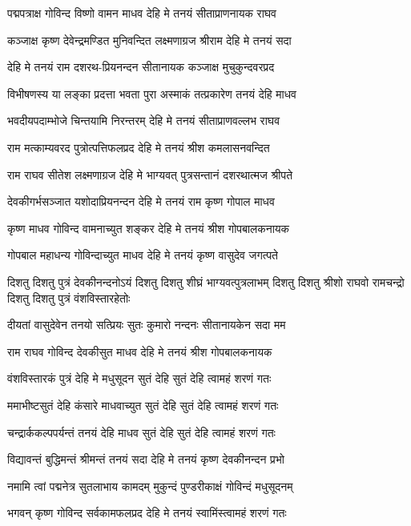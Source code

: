 \twolineshloka
{पद्मपत्राक्ष गोविन्द विष्णो वामन माधव}
{देहि मे तनयं सीताप्राणनायक राघव}%

\twolineshloka
{कञ्जाक्ष कृष्ण देवेन्द्रमण्डित मुनिवन्दित}
{लक्ष्मणाग्रज श्रीराम देहि मे तनयं सदा}%

\twolineshloka
{देहि मे तनयं राम दशरथ-प्रियनन्दन}
{सीतानायक कञ्जाक्ष मुचुकुन्दवरप्रद}%

\twolineshloka
{विभीषणस्य या लङ्का प्रदत्ता भवता पुरा}
{अस्माकं तत्प्रकारेण तनयं देहि माधव}%

\twolineshloka
{भवदीयपदाम्भोजे चिन्तयामि निरन्तरम्}
{देहि मे तनयं सीताप्राणवल्लभ राघव}%

\twolineshloka
{राम मत्काम्यवरद पुत्रोत्पत्तिफलप्रद}
{देहि मे तनयं श्रीश कमलासनवन्दित}%

\twolineshloka
{राम राघव सीतेश लक्ष्मणाग्रज देहि मे}
{भाग्यवत् पुत्रसन्तानं दशरथात्मज श्रीपते}%

\twolineshloka
{देवकीगर्भसञ्जात यशोदाप्रियनन्दन}
{देहि मे तनयं राम कृष्ण गोपाल माधव}%

\twolineshloka
{कृष्ण माधव गोविन्द वामनाच्युत शङ्कर}
{देहि मे तनयं श्रीश गोपबालकनायक}%

\twolineshloka
{गोपबाल महाधन्य गोविन्दाच्युत माधव}
{देहि मे तनयं कृष्ण वासुदेव जगत्पते}%

\fourlineindentedshloka
{दिशतु दिशतु पुत्रं देवकीनन्दनोऽयं}
{दिशतु दिशतु शीघ्रं भाग्यवत्पुत्रलाभम्}
{दिशतु दिशतु श्रीशो राघवो रामचन्द्रो}
{दिशतु दिशतु पुत्रं वंशविस्तारहेतोः}%

\twolineshloka
{दीयतां वासुदेवेन तनयो सत्प्रियः सुतः}
{कुमारो नन्दनः सीतानायकेन सदा मम}%

\twolineshloka
{राम राघव गोविन्द देवकीसुत माधव}
{देहि मे तनयं श्रीश गोपबालकनायक}%

\twolineshloka
{वंशविस्तारकं पुत्रं देहि मे मधुसूदन}
{सुतं देहि सुतं देहि त्वामहं शरणं गतः}%

\twolineshloka
{ममाभीष्टसुतं देहि कंसारे माधवाच्युत}
{सुतं देहि सुतं देहि त्वामहं शरणं गतः}%

\twolineshloka
{चन्द्रार्ककल्पपर्यन्तं तनयं देहि माधव}
{सुतं देहि सुतं देहि त्वामहं शरणं गतः}%

\twolineshloka
{विद्यावन्तं बुद्धिमन्तं श्रीमन्तं तनयं सदा}
{देहि मे तनयं कृष्ण देवकीनन्दन प्रभो}%

\twolineshloka
{नमामि त्वां पद्मनेत्र सुतलाभाय कामदम्}
{मुकुन्दं पुण्डरीकाक्षं गोविन्दं मधुसूदनम्}%

\twolineshloka
{भगवन् कृष्ण गोविन्द सर्वकामफलप्रद}
{देहि मे तनयं स्वामिंस्त्वामहं शरणं गतः}%

